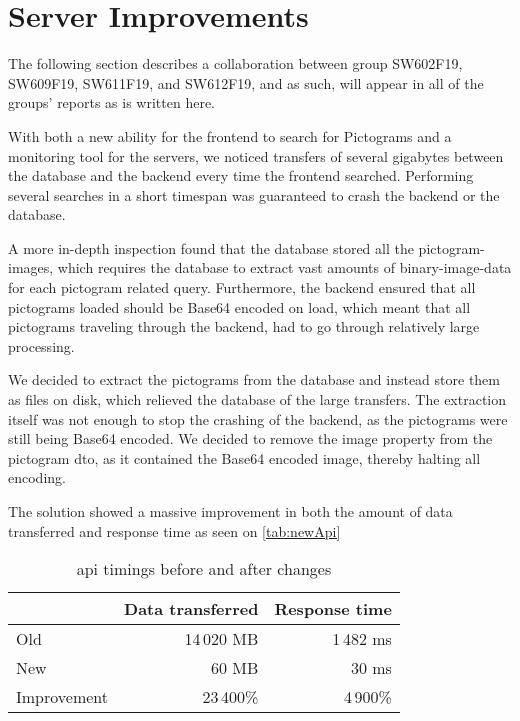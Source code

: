 \section{Server Improvements} \label{sec:serverImprovements}

The following section describes a collaboration between group SW602F19, SW609F19, SW611F19, and SW612F19, and as such, will appear in all of the groups' reports as is written here.

With both a new ability for the frontend to search for Pictograms and a monitoring tool for the servers, we noticed transfers of several gigabytes between the database and the backend every time the frontend searched. Performing several searches in a short timespan was guaranteed to crash the backend or the database.

A more in-depth inspection found that the database stored all the pictogram-images, which requires the database to extract vast amounts of binary-image-data for each pictogram related query. Furthermore, the backend ensured that all pictograms loaded should be Base64 encoded on load, which meant that all pictograms traveling through the backend, had to go through relatively large processing.

We decided to extract the pictograms from the database and instead store them as files on disk, which relieved the database of the large transfers. The extraction itself was not enough to stop the crashing of the backend, as the pictograms were still being Base64 encoded. We decided to remove the image property from the pictogram \gls{dto}, as it contained the Base64 encoded image, thereby halting all encoding.

The solution showed a massive improvement in both the amount of data transferred and response time as seen on \autoref{tab:newApi}

\begin{table}[H]
    \centering
    \begin{tabular}{|l|r|r|}
    \hline
                    & Data transferred  & Response time \\ \hline
        Old         & 14\,020 MB         & 1\,482 ms      \\ \hline
        New         & 60 MB             & 30 ms         \\ \hline
        Improvement & 23\,400\%          & 4\,900\%       \\ \hline
    \end{tabular}
    \caption{\gls{api} timings before and after changes}
    \label{tab:newApi}
\end{table}

